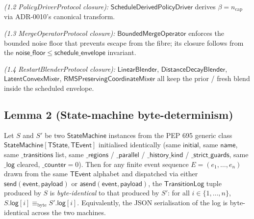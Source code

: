\documentclass[journal,twocolumn,final]{IEEEtran}
\begin{document}
\emph{(1.2 PolicyDriverProtocol closure):}
$\mathsf{ScheduleDerivedPolicyDriver}$ derives
$\beta = n_\mathrm{cap}$ via ADR-0010's canonical transform.

\emph{(1.3 MergeOperatorProtocol closure):} $\mathsf{BoundedMergeOperator}$
enforces the bounded noise floor that prevents escape from the fibre; its
closure follows from the $\mathsf{noise\_floor} \le \mathsf{schedule\_envelope}$
invariant.

\emph{(1.4 RestartBlenderProtocol closure):} $\mathsf{LinearBlender}$,
$\mathsf{DistanceDecayBlender}$, $\mathsf{LatentConvexMixer}$,
$\mathsf{RMSPreservingCoordinateMixer}$ all keep the prior / fresh blend
inside the scheduled envelope.

\subsection{Lemma 2 (State-machine byte-determinism)}

Let $S$ and $S'$ be two $\mathsf{StateMachine}$ instances from the PEP 695
generic class $\mathsf{StateMachine[TState, TEvent]}$ initialised identically
(same $\mathsf{initial}$, same $\mathsf{name}$, same $\mathsf{\_transitions}$
list, same $\mathsf{\_regions}$ / $\mathsf{\_parallel}$ / $\mathsf{\_history\_kind}$
/ $\mathsf{\_strict\_guards}$, same $\mathsf{\_log}$ cleared, $\mathsf{\_counter}=0$).
Then for any finite event sequence $E = (e_1, \dots, e_n)$ drawn from the same
$\mathsf{TEvent}$ alphabet and dispatched via either
$\mathsf{send}(\mathsf{event}, \mathsf{payload})$ or
$\mathsf{asend}(\mathsf{event}, \mathsf{payload})$, the $\mathsf{TransitionLog}$
tuple produced by $S$ is \emph{byte-identical} to that produced by $S'$: for
all $i \in \{1, \dots, n\}$, $S.\mathsf{log}[i] \equiv_\mathrm{byte}
S'.\mathsf{log}[i]$. Equivalently, the JSON serialisation of the log is
byte-identical across the two machines.
\end{document}
